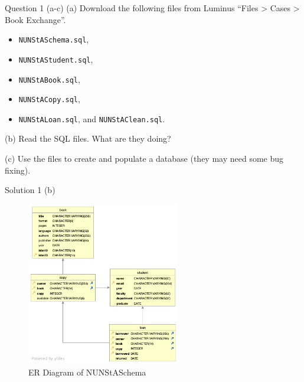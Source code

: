 \begin{frame}[fragile]{Question 1 (a-c)}
(a) Download the following files from Luminus ``Files > Cases > Book Exchange''.
\begin{itemize}
	\item[] \texttt{NUNStASchema.sql},
	\item[] \texttt{NUNStAStudent.sql},
	\item[] \texttt{NUNStABook.sql},
	\item[] \texttt{NUNStACopy.sql},
	\item[] \texttt{NUNStALoan.sql}, and \texttt{NUNStAClean.sql}.
\end{itemize}
\vspace{10pt}

(b) Read the SQL files. What are they doing? \vspace{10pt}

(c) Use the files to create and populate a database (they may need some bug fixing).
\end{frame}

\begin{frame}[fragile]{Solution 1 (b)}
\begin{figure}
\includegraphics[width=0.6\textwidth]{t1/images/t1-0.png}
\caption{ER Diagram of NUNStASchema}
\end{figure}
\end{frame}

